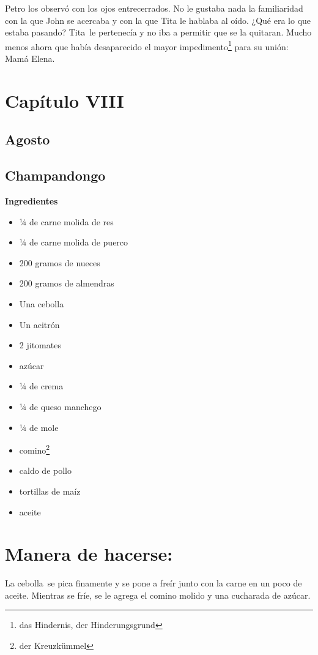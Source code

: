 Petro los observó con los ojos entrecerrados. No le gustaba nada la
familiaridad con la que John se acercaba y con la que Tita le hablaba al
oído. ¿Qué era lo que estaba pasando? Tita~le pertenecía y no iba
a permitir que se la quitaran. Mucho menos ahora que había desaparecido
el mayor impedimento\footnote{das Hindernis, der Hinderungsgrund}
para su unión: Mamá Elena.

\clearpage

\section*{ Capítulo VIII }
\subsection*{ Agosto }
\subsection*{ Champandongo }
\textbf{Ingredientes}
\begin{itemize}
    \item ¼ de carne molida de res
    \item ¼ de carne molida de puerco
    \item 200 gramos de nueces
    \item 200 gramos de almendras
    \item Una cebolla
    \item Un acitrón
    \item 2 jitomates
    \item azúcar
    \item ¼ de crema
    \item ¼ de queso manchego
    \item ¼ de mole
    \item comino\footnote{der Kreuzkümmel}
    \item caldo de pollo
    \item tortillas de maíz
    \item aceite
\end{itemize}

\section*{ Manera de hacerse: }
La cebolla~se pica finamente y se pone a freír junto con la carne
en un poco de aceite.
Mientras se fríe, se le agrega el comino molido y una cucharada de
azúcar.

